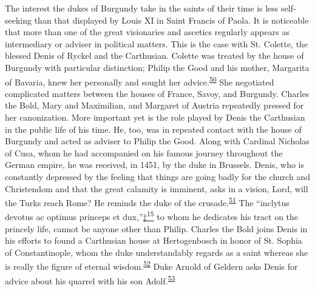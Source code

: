 The interest the dukes of Burgundy take in the saints of their time is
less self-seeking than that displayed by Louis XI in Saint Francis of
Paola. It is noticeable that more than one of the great visionaries and
ascetics regularly appears as intermediary or adviser in political
matters. This is the case with St. Colette, the blessed Denis of Ryckel
and the Carthusian. Colette was treated by the house of Burgundy with
particular distinction; Philip the Good and his mother, Margarita of
Bavaria, knew her personally and sought her
advice.\textsuperscript{\protect\hypertarget{14_Chapter_Seven__THE_PIOUS_PERSONA.xhtmlux5cux23id_925}{\protect\hyperlink{23_NOTES.xhtmlux5cux23id_926}{50}}}
She negotiated complicated matters between the houses of France, Savoy,
and Burgundy. Charles the Bold, Mary and Maximilian, and Margaret of
Austria repeatedly pressed for her canonization. More important yet is
the role played by Denis the Carthusian in the public life of his time.
He, too, was in repeated contact with the house of Burgundy and acted as
adviser to Philip the Good. Along with Cardinal Nicholas of Cusa, whom
he had accompanied on his famous journey throughout the German empire,
he was received, in 1451, by the duke in Brussels. Denis, who is
constantly depressed by the feeling that things are going badly for the
church and Christendom and that the great calamity is imminent, asks in
a vision, Lord, will the Turks reach Rome? He reminds the duke of the
crusade.\textsuperscript{\protect\hypertarget{14_Chapter_Seven__THE_PIOUS_PERSONA.xhtmlux5cux23id_923}{\protect\hyperlink{23_NOTES.xhtmlux5cux23id_924}{51}}}
The ``inclytus devotus ac optimus princeps et
dux,''\protect\hypertarget{14_Chapter_Seven__THE_PIOUS_PERSONA.xhtmlux5cux23id_2325}{\protect\hyperlink{23_NOTES.xhtmlux5cux23id_2326}{‡\textsuperscript{15}}}
to whom he dedicates his tract on the princely life, cannot be anyone
other than Philip. Charles the Bold joins Denis in his efforts to found
a Carthusian house at
Hertogen\protect\hypertarget{14_Chapter_Seven__THE_PIOUS_PERSONA.xhtmlux5cux23page_218}{}{}bosch
in honor of St. Sophia of Constantinople, whom the duke understandably
regards as a saint whereas she is really the figure of eternal
wisdom.\textsuperscript{\protect\hypertarget{14_Chapter_Seven__THE_PIOUS_PERSONA.xhtmlux5cux23id_921}{\protect\hyperlink{23_NOTES.xhtmlux5cux23id_922}{52}}}
Duke Arnold of Geldern asks Denis for advice about his quarrel with his
son
Adolf.\textsuperscript{\protect\hypertarget{14_Chapter_Seven__THE_PIOUS_PERSONA.xhtmlux5cux23id_919}{\protect\hyperlink{23_NOTES.xhtmlux5cux23id_920}{53}}}

